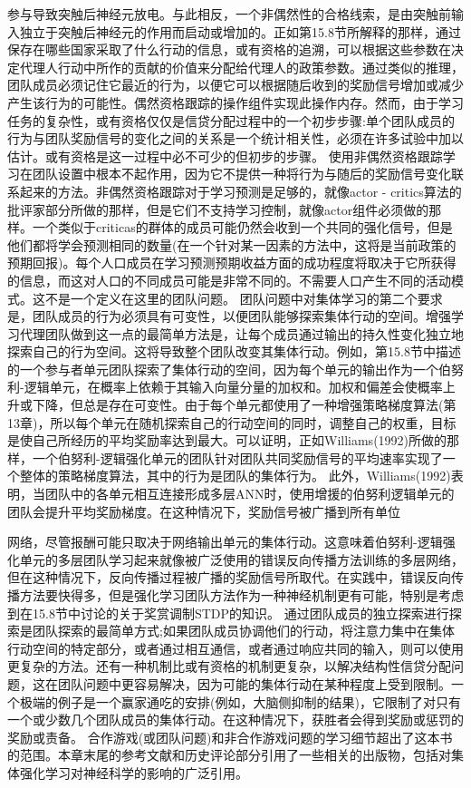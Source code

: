 参与导致突触后神经元放电。与此相反，一个非偶然性的合格线索，是由突触前输入独立于突触后神经元的作用而启动或增加的。正如第15.8节所解释的那样，通过保存在哪些国家采取了什么行动的信息，或有资格的追溯，可以根据这些参数在决定代理人行动中所作的贡献的价值来分配给代理人的政策参数。通过类似的推理，团队成员必须记住它最近的行为，以便它可以根据随后收到的奖励信号增加或减少产生该行为的可能性。偶然资格跟踪的操作组件实现此操作内存。然而，由于学习任务的复杂性，或有资格仅仅是信贷分配过程中的一个初步步骤:单个团队成员的行为与团队奖励信号的变化之间的关系是一个统计相关性，必须在许多试验中加以估计。或有资格是这一过程中必不可少的但初步的步骤。
使用非偶然资格跟踪学习在团队设置中根本不起作用，因为它不提供一种将行为与随后的奖励信号变化联系起来的方法。非偶然资格跟踪对于学习预测是足够的，就像actor - critics算法的批评家部分所做的那样，但是它们不支持学习控制，就像actor组件必须做的那样。一个类似于criticas的群体的成员可能仍然会收到一个共同的强化信号，但是他们都将学会预测相同的数量(在一个针对某一因素的方法中，这将是当前政策的预期回报)。每个人口成员在学习预测预期收益方面的成功程度将取决于它所获得的信息，而这对人口的不同成员可能是非常不同的。不需要人口产生不同的活动模式。这不是一个定义在这里的团队问题。
团队问题中对集体学习的第二个要求是，团队成员的行为必须具有可变性，以便团队能够探索集体行动的空间。增强学习代理团队做到这一点的最简单方法是，让每个成员通过输出的持久性变化独立地探索自己的行为空间。这将导致整个团队改变其集体行动。例如，第15.8节中描述的一个参与者单元团队探索了集体行动的空间，因为每个单元的输出作为一个伯努利-逻辑单元，在概率上依赖于其输入向量分量的加权和。加权和偏差会使概率上升或下降，但总是存在可变性。由于每个单元都使用了一种增强策略梯度算法(第13章)，所以每个单元在随机探索自己的行动空间的同时，调整自己的权重，目标是使自己所经历的平均奖励率达到最大。可以证明，正如Williams(1992)所做的那样，一个伯努利-逻辑强化单元的团队针对团队共同奖励信号的平均速率实现了一个整体的策略梯度算法，其中的行为是团队的集体行为。
此外，Williams(1992)表明，当团队中的各单元相互连接形成多层ANN时，使用增援的伯努利逻辑单元的团队会提升平均奖励梯度。在这种情况下，奖励信号被广播到所有单位

网络，尽管报酬可能只取决于网络输出单元的集体行动。这意味着伯努利-逻辑强化单元的多层团队学习起来就像被广泛使用的错误反向传播方法训练的多层网络，但在这种情况下，反向传播过程被广播的奖励信号所取代。在实践中，错误反向传播方法要快得多，但是强化学习团队方法作为一种神经机制更有可能，特别是考虑到在15.8节中讨论的关于奖赏调制STDP的知识。
通过团队成员的独立探索进行探索是团队探索的最简单方式;如果团队成员协调他们的行动，将注意力集中在集体行动空间的特定部分，或者通过相互通信，或者通过响应共同的输入，则可以使用更复杂的方法。还有一种机制比或有资格的机制更复杂，以解决结构性信贷分配问题，这在团队问题中更容易解决，因为可能的集体行动在某种程度上受到限制。一个极端的例子是一个赢家通吃的安排(例如，大脑侧抑制的结果)，它限制了对只有一个或少数几个团队成员的集体行动。在这种情况下，获胜者会得到奖励或惩罚的奖励或责备。
合作游戏(或团队问题)和非合作游戏问题的学习细节超出了这本书的范围。本章末尾的参考文献和历史评论部分引用了一些相关的出版物，包括对集体强化学习对神经科学的影响的广泛引用。

